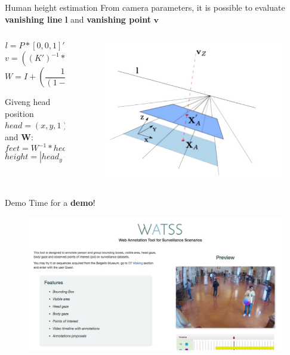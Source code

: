 \documentclass{beamer}
\begin{document}
\begin{tframe}{Human height estimation}
From camera parameters, it is possible to evaluate \textbf{vanishing line} $\textbf{l}$ and \textbf{vanishing point} $\textbf{v}$


\begin{columns}[t] %
\begin{column}{.45\textwidth}
$$l = P * [0, 0, 1]'$$
$$v = ((K')^{-1} * K^{-1}) * l$$
$$W = I + (\frac{1}{(1 - \mu)} - 1) * \frac{v * l'}{v' * l}$$

\vspace{0.2cm}
Giveng head position $head = (x, y, 1)$ and $\textbf{W}$:
$$feet = W^{-1} * head$$
$$height = |head_y - feet_y|$$

\end{column}%
\begin{column}{.5\textwidth}
\begin{figure}[h]
\centering
\includegraphics[width=1.1\textwidth]{images/height_calib.jpg}
\end{figure}
\end{column}%
\end{columns}


\end{tframe}


\begin{tframe}{Demo}
Time for a \textbf{demo}!
\begin{figure}[h]
\centering
\includegraphics[width=1\textwidth]{images/demo.jpg}
\end{figure}
\end{tframe}
\end{document}
